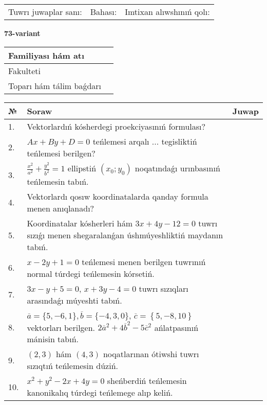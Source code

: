 \documentclass{article}
\begin{document}
\vspace{1cm}

\begin{tabular}{lll}
Tuwrı juwaplar sanı: \underline{\hspace{1.5cm}} & 
Bahası: \underline{\hspace{1.5cm}} & 
Imtixan alıwshınıń qolı: \underline{\hspace{2cm}} \\
\end{tabular}

\egroup

\newpage


\textbf{73-variant}\\

\bgroup
\def\arraystretch{1.6} %

\begin{tabular}{|m{5.7cm}|m{9.5cm}|}
\hline
Familiyası hám atı & \\
\hline
Fakulteti  & \\
\hline
Toparı hám tálim baǵdarı  & \\
\hline
\end{tabular}

\vspace{1cm}

\begin{tabular}{|m{0.7cm}|m{10cm}|m{4cm}|}
\hline
№ & Soraw & Juwap \\
\hline
1. & Vektorlardıń kósherdegi proekciyasınıń formulası? &  \\
\hline
2. & $Ax+By+D=0$ teńlemesi arqalı ... tegisliktiń teńlemesi berilgen? &  \\
\hline
3. & $\frac{x^2}{a^2}+\frac{y^2}{b^2}=1$ ellipstiń $(x_0;y_0)$ noqatındaǵı urınbasınıń teńlemesin tabıń. &  \\
\hline
4. & Vektorlardı qosıw koordinatalarda qanday formula menen anıqlanadı? &  \\
\hline
5. & Koordinatalar kósherleri hám $ 3x+4y-12=0 $ tuwrı sızıǵı menen shegaralanǵan úshmúyeshliktiń maydanın tabıń. &  \\
\hline
6. & $x-2y+1=0$ teńlemesi menen berilgen tuwrınıń normal túrdegi teńlemesin kórsetiń. &  \\
\hline
7. & $3x-y+5=0$, $x+3y-4=0$ tuwrı sızıqları arasındaǵı múyeshti tabıń. &  \\
\hline
8. & $\overline{a}=\{5,-6, 1 \}, \overline{b}=\{-4, 3, 0 \} $, $\overline{c}=\left\{ 5,-8, 10 \right\}$ vektorları berilgen. $2{\overline{a}}^{2}+4{\overline{b}}^{2}-5{\overline{c}}^{2}$ ańlatpasınıń mánisin tabıń. &  \\
\hline
9. & $(2, 3)$ hám $(4, 3)$ noqatlarınan ótiwshi tuwrı sızıqtıń teńlemesin dúziń. &  \\
\hline
10. & $x^{2}+y^{2}-2x+4y=0$ sheńberdiń teńlemesin kanonikalıq túrdegi teńlemege alıp keliń. &  \\
\hline
\end{tabular}
\end{document}
